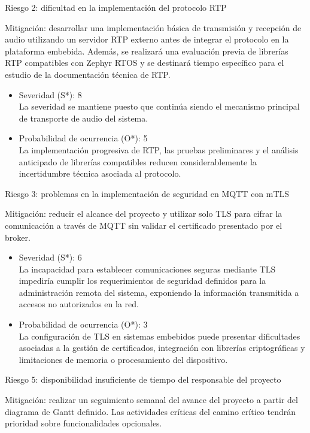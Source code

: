\documentclass[
11pt, %
]{charter}
\begin{document}
Riesgo 2: dificultad en la implementación del protocolo RTP

Mitigación: desarrollar una implementación básica de transmisión y recepción de audio utilizando un servidor RTP externo antes de integrar el protocolo en la plataforma embebida. Además, se realizará una evaluación previa de librerías RTP compatibles con Zephyr RTOS y se destinará tiempo específico para el estudio de la documentación técnica de RTP.
\begin{itemize}
	\item Severidad (S*): 8 \\
	La severidad se mantiene puesto que continúa siendo el mecanismo principal de transporte de audio del sistema.
	\item Probabilidad de ocurrencia (O*):  5 \\
	La implementación progresiva de RTP, las pruebas preliminares y el análisis anticipado de librerías compatibles reducen considerablemente la incertidumbre técnica asociada al protocolo.
\end{itemize}


Riesgo 3: problemas en la implementación de seguridad en MQTT con mTLS

Mitigación: reducir el alcance del proyecto y utilizar solo TLS para cifrar la comunicación a través de MQTT sin validar el certificado presentado por el broker.
\begin{itemize}
	\item Severidad (S*): 6 \\
	La incapacidad para establecer comunicaciones seguras mediante TLS impediría cumplir los requerimientos de seguridad definidos para la administración remota del sistema, exponiendo la información transmitida a accesos no autorizados en la red.
	\item Probabilidad de ocurrencia (O*): 3 \\
	La configuración de TLS en sistemas embebidos puede presentar dificultades asociadas a la gestión de certificados, integración con librerías criptográficas y limitaciones de memoria o procesamiento del dispositivo.
\end{itemize}

Riesgo 5: disponibilidad insuficiente de tiempo del responsable del proyecto

Mitigación: realizar un seguimiento semanal del avance del proyecto a partir del diagrama de Gantt definido. Las actividades críticas del camino crítico tendrán prioridad sobre funcionalidades opcionales.
\end{document}
